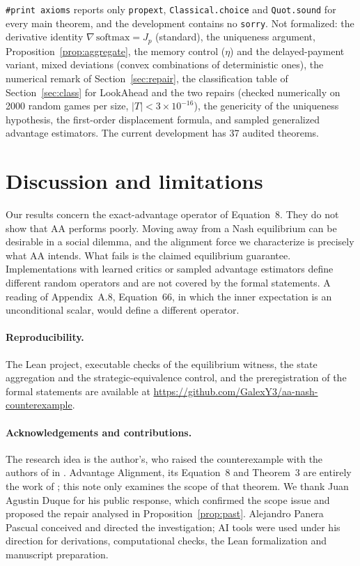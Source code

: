 \documentclass[11pt]{article}
\theoremstyle{remark}
\begin{document}
\texttt{\#print axioms} reports only \texttt{propext}, \texttt{Classical.choice} and \texttt{Quot.sound} for every main theorem, and the development contains no \texttt{sorry}. Not formalized: the derivative identity $\nabla\,\mathrm{softmax}=J_p$ (standard), the uniqueness argument, Proposition~\ref{prop:aggregate}, the memory control ($\eta$) and the delayed-payment variant, mixed deviations (convex combinations of deterministic ones), the numerical remark of Section~\ref{sec:repair}, the classification table of Section~\ref{sec:class} for LookAhead and the two repairs (checked numerically on 2000 random games per size, $|T|<3\times10^{-16}$), the genericity of the uniqueness hypothesis, the first-order displacement formula, and sampled generalized advantage estimators. The current development has 37 audited theorems.

\section{Discussion and limitations}

Our results concern the exact-advantage operator of Equation~8. They do not show that AA performs poorly. Moving away from a Nash equilibrium can be desirable in a social dilemma, and the alignment force we characterize is precisely what AA intends. What fails is the claimed equilibrium guarantee. Implementations with learned critics or sampled advantage estimators define different random operators and are not covered by the formal statements. A reading of Appendix~A.8, Equation~66, in which the inner expectation is an unconditional scalar, would define a different operator.

\paragraph{Reproducibility.} The Lean project, executable checks of the equilibrium witness, the state aggregation and the strategic-equivalence control, and the preregistration of the formal statements are available at \url{https://github.com/GalexY3/aa-nash-counterexample}.

\paragraph{Acknowledgements and contributions.} The research idea is the author's, who raised the counterexample with the authors of \citet{duque2025aa} in \citet{duque2026issue}. Advantage Alignment, its Equation~8 and Theorem~3 are entirely the work of \citet{duque2025aa}; this note only examines the scope of that theorem. We thank Juan Agustin Duque for his public response, which confirmed the scope issue and proposed the repair analysed in Proposition~\ref{prop:past}. Alejandro Panera Pascual conceived and directed the investigation; AI tools were used under his direction for derivations, computational checks, the Lean formalization and manuscript preparation.
\end{document}
